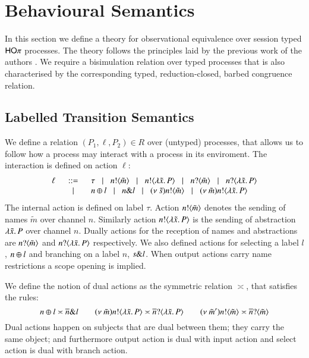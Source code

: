 \section{Behavioural Semantics}
\label{sec:beh_sem}

In this section we define a theory for observational equivalence over
session typed $\mathsf{HO}\pi$ processes. The theory follows the principles
laid by the previous work of the authors
\cite{DBLP:conf/forte/KouzapasYH11,KY13,dkphdthesis}.
We require a bisimulation relation over typed processes that
is also characterised by the corresponding typed, reduction-closed,
barbed congruence relation.


\subsection{Labelled Transition Semantics}\label{ss:lts}

We define a relation $(P_1, \ell, P_2) \in R$ over
(untyped) processes, that allows us to follow how a process may
interact with a process in its enviroment. The interaction
is defined on action $\ell$:
%
\[
\begin{array}{rcl}
		\ell	& \;\;::=\;\;  & \tau 
		\;\;\;|\;\;\; n ! \langle \tilde{m} \rangle 
		\;\;\;|\;\;\; n ! \langle \lambda \tilde{x}.\,P \rangle 
		\;\;\;|\;\;\;n ? \langle \tilde{m} \rangle 
		\;\;\;|\;\;\; n ? \langle \lambda \tilde{x}.\,P \rangle \\
			& \;\;\;|\;\;\; & n \oplus l 
			\;\;\;|\;\;\; n \& l 
			\;\;\;|\;\;\; (\nu\ \tilde{s}) n ! \langle \tilde{m} \rangle 
			\;\;\;|\;\;\; (\nu\ \tilde{m}) n ! \langle \lambda \tilde{x}.\,P \rangle
\end{array}
\]
%
\noi The internal action is defined on label $\tau$.
Action $n ! \langle \tilde{m} \rangle$ denotes the sending of names $\tilde{m}$ over channel $n$.
Similarly action $n ! \langle \lambda \tilde{x}.\,P \rangle$ is the sending of abstraction $\lambda \tilde{x}.\,P$
over channel $n$. Dually actions for the reception of names and abstractions are
$n ? \langle \tilde{m} \rangle$ and $n ? \langle \lambda \tilde{x}.\,P \rangle$ respectively. We also defined
actions for selecting a label $l$, $n \oplus l$ and branching on a label
$n$, $s \& l$. When output actions carry name restrictions a scope
opening is implied.

We define the notion of dual actions as the symmetric relation $\asymp$, that satisfies the rules:
%
\[
	n \oplus l \asymp \overline{n} \& l
	\qquad
	(\nu\ \tilde{m}) n ! \langle \lambda \tilde{x}.\,P \rangle \asymp \overline{n} ? \langle \lambda \tilde{x}.\,P \rangle
	\qquad
	(\nu\ \tilde{m}') n ! \langle \tilde{m} \rangle \asymp \overline{n} ? \langle \tilde{m} \rangle
\]
%
Dual actions happen on subjects that are dual between them; they carry the same
object; and furthermore output action is dual with input action and 
select action is dual with branch action.

